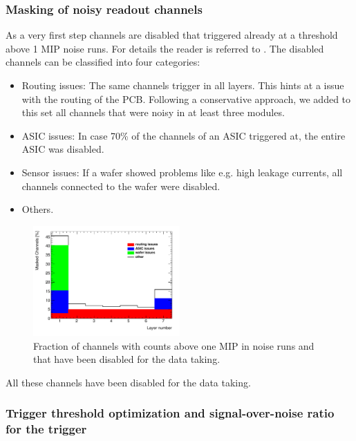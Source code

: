 \documentclass[final,3p,times,twocolumn]{elsarticle}
\begin{document}
\subsubsection{Masking of noisy readout channels}
\label{sec:noisy}

As a very first step channels are disabled that triggered already at
a threshold above 1 MIP noise runs.
For details the reader is referred to \cite{Bilokin:2018gfn}. The disabled channels can be classified into four categories:


\begin{itemize}
\item Routing issues: The same channels trigger in all layers. This hints at a issue with the routing of the PCB. 
  Following a conservative approach, we added to this set all channels that were noisy in at least three modules.
\item ASIC issues: In case 70\% of the channels of an ASIC triggered at, the entire ASIC was disabled.
  \item Sensor issues: If a wafer showed problems like  e.g. high leakage currents, all channels connected to the wafer were disabled.  
\item Others.
\end{itemize}

\begin{figure}[h!]
  \includegraphics[width=0.5\textwidth]{masked_layer-eps-converted-to.pdf} 
\caption{Fraction of channels with counts above one MIP in noise runs and that have been disabled for the data taking.}
\label{noisycells}
\end{figure}

All these channels have been disabled for the data taking.

\subsubsection{Trigger threshold optimization and signal-over-noise ratio for the trigger}
\label{sec:comm_trigger}
\end{document}
